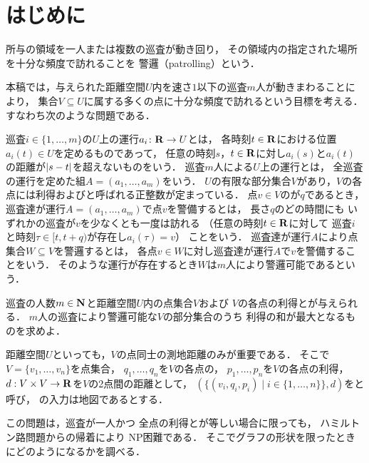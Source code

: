 \chapter{はじめに}
\label{chapter: introduction}
所与の領域を一人または複数の巡査が動き回り，
その領域内の指定された場所を十分な頻度で訪れることを
警邏（patrolling）という\cite{
  Dumitrescu:2014:CGC:2636805.2636822,
  chen2013fence,
  coene2011charlemagne,
  czyzowicz2011boundary}．

本稿では，与えられた距離空間$U$内を速さ$1$以下の巡査$m$人が動きまわることにより，
集合$V \subseteq U$に属する多くの点に十分な頻度で訪れるという目標を考える．
すなわち次のような問題である．

巡査$i \in \{1, \ldots, m\}$の$U$上の運行$a _i \colon \mathbf R \to U$とは，
各時刻$t \in \mathbf R$における位置$a _i (t) \in U$を定めるものであって，
任意の時刻$s$，$t \in \mathbf R$に対し$a _i (s)$と$a _i (t)$の距離が$\lvert{s - t}\rvert$を超えないものをいう．
巡査$m$人による$U$上の運行とは，
全巡査の運行を定めた組$A = (a _1, \dots, a _m)$をいう．
$U$の有限な部分集合$V$があり，$V$の各点には利得および{\maxIdletime}と呼ばれる正整数が定まっている．
点$v \in V$の{\maxIdletime}が$q$であるとき，
巡査達が運行$A = (a _1, \dots, a _m)$で点$v$を警備するとは，
長さ$q$のどの時間にも
いずれかの巡査が$v$を少なくとも一度は訪れる
（任意の時刻$t \in \mathbf R$に対して
巡査$i$と時刻$\tau \in [t, t + q)$が存在し$a _i (\tau) = v$）
ことをいう．
巡査達が運行$A$により点集合$W \subseteq V$を警邏するとは，
各点$v \in W$に対し巡査達が運行$A$で$v$を警備することをいう．
そのような運行が存在するとき$W$は$m$人により警邏可能であるという．

\begin{patrollingProblem}
  巡査の人数$m \in \mathbf N$と距離空間$U$内の点集合$V$および
  $V$の各点の利得と{\maxIdletime}が与えられる．
  $m$人の巡査により警邏可能な$V$の部分集合のうち
  利得の和が最大となるものを求めよ．
\end{patrollingProblem}

距離空間$U$といっても，$V$の点同士の測地距離のみが重要である．
そこで
$V = \{ v_1, \ldots, v_n \}$を点集合，
$q_1, \ldots, q_n$を$V$の各点の{\maxIdletime}，
$p_1, \ldots, p_n$を$V$の各点の利得，
$d : V \times V \to \mathbf R$を$V$の2点間の距離として，
$(\{ (v_i, q_i, p_i) \mid i \in \{ 1, \ldots, n \} \}, d )$をと呼び，
{\patProb}の入力は地図であるとする．

この問題は，巡査が一人かつ
全点の利得と{\maxIdletime}が等しい場合に限っても，
ハミルトン路問題からの帰着により
NP困難である\cite[Theorem~8]{coene2011charlemagne}．
そこでグラフの形状を限ったときにどのようになるかを調べる．

